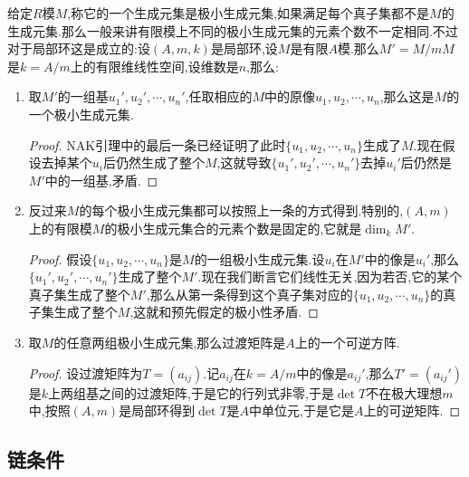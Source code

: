给定$R$模$M$,称它的一个生成元集是极小生成元集,如果满足每个真子集都不是$M$的生成元集.那么一般来讲有限模上不同的极小生成元集的元素个数不一定相同.不过对于局部环这是成立的:设$(A,m,k)$是局部环,设$M$是有限$A$模.那么$M'=M/mM$是$k=A/m$上的有限维线性空间,设维数是$n$,那么:
\begin{enumerate}
	\item 取$M'$的一组基$u_1',u_2',\cdots,u_n'$,任取相应的$M$中的原像$u_1,u_2,\cdots,u_n$,那么这是$M$的一个极小生成元集.
	\begin{proof}
		
		NAK引理中的最后一条已经证明了此时$\{u_1,u_2,\cdots,u_n\}$生成了$M$.现在假设去掉某个$u_i$后仍然生成了整个$M$,这就导致$\{u_1',u_2',\cdots,u_n'\}$去掉$u_i'$后仍然是$M'$中的一组基,矛盾.
	\end{proof}
	\item 反过来$M$的每个极小生成元集都可以按照上一条的方式得到.特别的,$(A,m)$上的有限模$M$的极小生成元集合的元素个数是固定的,它就是$\dim_kM'$.
	\begin{proof}
		
		假设$\{u_1,u_2,\cdots,u_n\}$是$M$的一组极小生成元集.设$u_i$在$M'$中的像是$u_i'$,那么$\{u_1',u_2',\cdots,u_n'\}$生成了整个$M'$.现在我们断言它们线性无关,因为若否,它的某个真子集生成了整个$M'$,那么从第一条得到这个真子集对应的$\{u_1,u_2,\cdots,u_n\}$的真子集生成了整个$M$,这就和预先假定的极小性矛盾.
	\end{proof}
	\item 取$M$的任意两组极小生成元集,那么过渡矩阵是$A$上的一个可逆方阵.
	\begin{proof}
		
		设过渡矩阵为$T=(a_{ij})$.记$a_{ij}$在$k=A/m$中的像是$a_{ij}'$,那么$T'=(a_{ij}')$是$k$上两组基之间的过渡矩阵,于是它的行列式非零,于是$\det T$不在极大理想$m$中,按照$(A,m)$是局部环得到$\det T$是$A$中单位元,于是它是$A$上的可逆矩阵.
	\end{proof}
\end{enumerate}
\newpage
\subsection{链条件}
